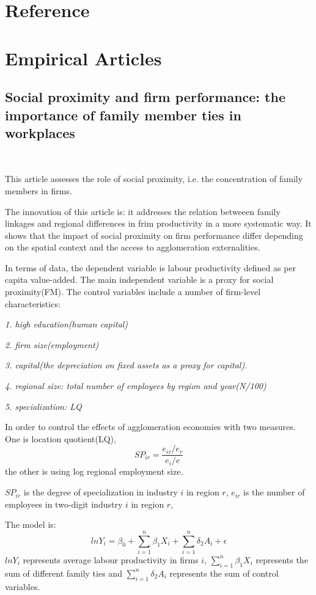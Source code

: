 \documentclass{article}
\begin{document}
\section{Reference}
\section{Empirical Articles}

\subsection{Social proximity and firm performance: the importance of family member ties in workplaces}
    ~\

    This article assesses the role of social proximity, i.e. the concentration of family members in firms.
    
    The innovation of this article is: it addresses the relation betweeen family linkages and regional differences in frim productivity
    in a more systematic way. It shows that the impact of social proximity on firm performance differ
    depending on the spatial context and the access to agglomeration externalities.

    In terms of data, the dependent variable is labour productivity defined as per capita value-added. The main independent variable 
    is a proxy for social proximity(FM). The control variables include a number of firm-level characteristics:
    
    \emph{1. high education(human capital)} 
    
    \emph{2. firm size(employment)} 
    
    \emph{3. capital(the depreciation on fixed assets as a proxy for capital). }
    
    \emph{4. regional size: total number of employees by region and year(N/100)}
    
    \emph{5. specialization: LQ}

    In order to control the effects of agglomeration economies with two measures. One is location quotient(LQ), 
    \begin{equation}
        SP_{ir}=\frac{e_{ir}/e_r}{e_i/e}
    \end{equation}
    the other is using log regional employment size. 

    $SP_{ir}$ is the degree of specialization in industry $i$ in region $r$, 
    $e_{ir}$ is the number of employees in two-digit industry $i$ in region $r$, 

    The model is:
    \begin{equation}
        lnY_i=\beta_0+\sum_{i=1}^n\beta_1X_i+\sum_{i=1}^n\delta_2A_i+\epsilon
    \end{equation}
    $lnY_i$ represents average labour productivity in firms $i$, 
    $\sum_{i=1}^n\beta_1X_i$ represents the sum of different family ties and $\sum_{i=1}^n\delta_2A_i$ represents the sum of control variables.
    
\end{document}
